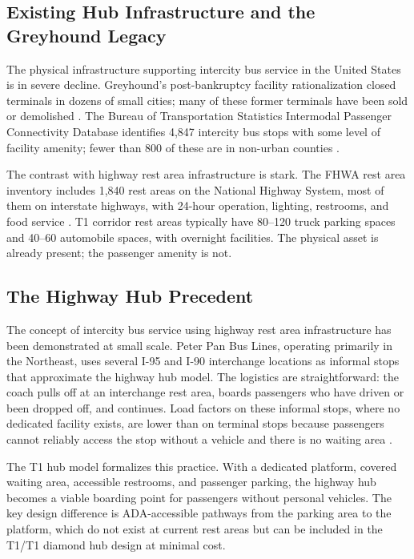 \subsection{Existing Hub Infrastructure and the Greyhound Legacy}

The physical infrastructure supporting intercity bus service in the United States is in severe decline. Greyhound's post-bankruptcy facility rationalization closed terminals in dozens of small cities; many of these former terminals have been sold or demolished \citep{Amtrak2023}. The Bureau of Transportation Statistics Intermodal Passenger Connectivity Database identifies 4,847 intercity bus stops with some level of facility amenity; fewer than 800 of these are in non-urban counties \citep{BTS_intermodal2023}.

The contrast with highway rest area infrastructure is stark. The FHWA rest area inventory includes 1,840 rest areas on the National Highway System, most of them on interstate highways, with 24-hour operation, lighting, restrooms, and food service \citep{FHWA_NHS2023}. T1 corridor rest areas typically have 80--120 truck parking spaces and 40--60 automobile spaces, with overnight facilities. The physical asset is already present; the passenger amenity is not.

\subsection{The Highway Hub Precedent}

The concept of intercity bus service using highway rest area infrastructure has been demonstrated at small scale. Peter Pan Bus Lines, operating primarily in the Northeast, uses several I-95 and I-90 interchange locations as informal stops that approximate the highway hub model. The logistics are straightforward: the coach pulls off at an interchange rest area, boards passengers who have driven or been dropped off, and continues. Load factors on these informal stops, where no dedicated facility exists, are lower than on terminal stops because passengers cannot reliably access the stop without a vehicle and there is no waiting area \citep{BTS_intermodal2023}.

The T1 hub model formalizes this practice. With a dedicated platform, covered waiting area, accessible restrooms, and passenger parking, the highway hub becomes a viable boarding point for passengers without personal vehicles. The key design difference is ADA-accessible pathways from the parking area to the platform, which do not exist at current rest areas but can be included in the T1/T1 diamond hub design at minimal cost.

